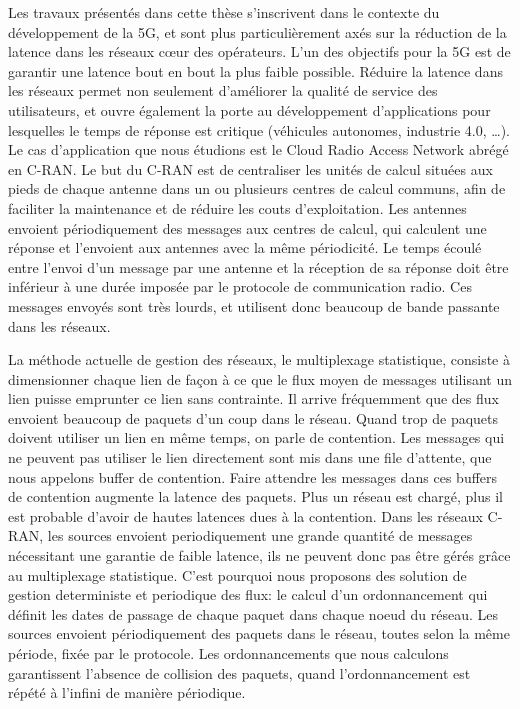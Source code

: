 
\label{chap:introfr}


Les travaux présentés dans cette thèse s'inscrivent dans le contexte du développement de la 5G, et sont plus particulièrement axés sur la réduction de la latence dans les réseaux cœur des opérateurs.
L'un des objectifs pour la 5G est de garantir une latence bout en bout la plus faible possible.
Réduire la latence dans les réseaux permet non seulement d'améliorer la qualité de service des utilisateurs, et ouvre également la porte au développement d'applications pour lesquelles le temps de réponse est critique (véhicules autonomes, industrie 4.0, \ldots).
Le cas d'application que nous étudions est le Cloud Radio Access Network abrégé en C-RAN. Le but du C-RAN est de centraliser les unités de calcul situées aux pieds de chaque antenne dans un ou plusieurs centres de calcul communs, afin de faciliter la maintenance et de réduire les couts d'exploitation. Les antennes envoient périodiquement des messages aux centres de calcul, qui calculent une réponse et l'envoient aux antennes avec la même périodicité. Le temps écoulé entre l'envoi d'un message par une antenne et la réception de sa réponse doit être inférieur à une durée imposée par le protocole de communication radio. Ces messages envoyés sont très lourds, et utilisent donc beaucoup de bande passante dans les réseaux.

La méthode actuelle de gestion des réseaux, le multiplexage statistique, consiste à dimensionner chaque lien de façon à ce que le flux moyen de messages utilisant un lien puisse emprunter ce lien sans contrainte. Il arrive fréquemment que des flux envoient beaucoup de paquets d'un coup dans le réseau. Quand trop de paquets doivent utiliser un lien en même temps, on parle de contention. Les messages qui ne peuvent pas utiliser le lien directement sont mis dans une file d'attente, que nous appelons buffer de contention. Faire attendre les messages dans ces buffers de contention augmente la latence des paquets. Plus un réseau est chargé, plus il est probable d'avoir de hautes latences dues à la contention. Dans les réseaux C-RAN, les sources envoient periodiquement une grande quantité de messages nécessitant une garantie de faible latence, ils ne peuvent donc pas être gérés grâce au multiplexage statistique. C'est pourquoi nous proposons des solution de gestion deterministe et periodique des flux: le calcul d'un ordonnancement qui définit les dates de passage de chaque paquet dans chaque noeud du réseau. Les sources envoient périodiquement des paquets dans le réseau, toutes selon la même période, fixée par le protocole. Les ordonnancements que nous calculons garantissent l'absence de collision des paquets, quand l'ordonnancement est répété à l'infini de manière périodique.

